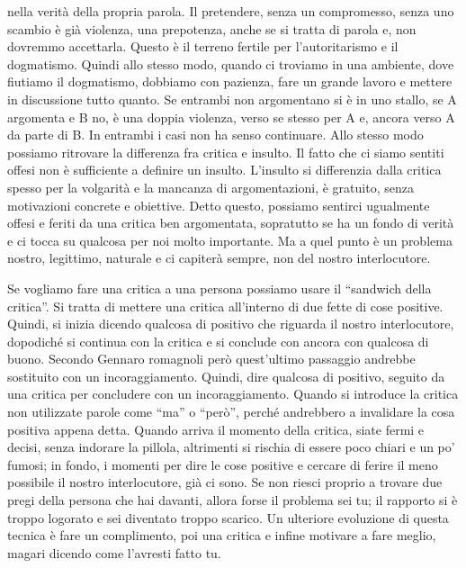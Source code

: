 \documentclass[12pt]{book} %
\begin{document}
nella verità della propria parola. Il pretendere, senza un compromesso, senza uno scambio è già violenza, una
prepotenza, anche se si tratta di parola e, non dovremmo accettarla. Questo è il terreno fertile per
l'autoritarismo e il dogmatismo. Quindi allo stesso modo, quando ci troviamo in una ambiente, dove
fiutiamo il dogmatismo, dobbiamo con pazienza, fare un grande lavoro e mettere in discussione tutto quanto. Se entrambi
non argomentano si è in uno stallo, se A argomenta e B no, è una doppia violenza, verso se stesso per A e, ancora verso
A da parte di B. In entrambi i casi non ha senso continuare. Allo stesso modo possiamo ritrovare la differenza fra
critica e insulto. Il fatto che ci siamo sentiti offesi non è sufficiente a definire un insulto.
L'insulto si differenzia dalla critica spesso per la volgarità e la mancanza di argomentazioni, è
gratuito, senza motivazioni concrete e obiettive. Detto questo, possiamo sentirci ugualmente offesi e feriti da una
critica ben argomentata, sopratutto se ha un fondo di verità e ci tocca su qualcosa per noi molto importante. Ma a quel
punto è un problema nostro, legittimo, naturale e ci capiterà sempre, non del nostro interlocutore. 


\bigskip

Se vogliamo fare una critica a una persona possiamo usare il “sandwich della critica”. Si tratta di mettere una critica
all'interno di due fette di cose positive. Quindi, si inizia dicendo qualcosa di positivo che
riguarda il nostro interlocutore, dopodiché si continua con la critica e si conclude con ancora con qualcosa di buono.
Secondo Gennaro romagnoli però quest'ultimo passaggio andrebbe sostituito con un  incoraggiamento. Quindi, dire qualcosa di positivo, seguito da una critica per concludere con un incoraggiamento.
Quando si introduce la critica non utilizzate parole come “ma” o “però”, perché andrebbero a invalidare la cosa
positiva appena detta. Quando arriva il momento della critica, siate fermi e decisi, senza indorare la pillola,
altrimenti si rischia di essere poco chiari e un po' fumosi; in fondo, i momenti per dire le cose
positive e cercare di ferire il meno possibile il nostro interlocutore, già ci sono. Se non riesci proprio a trovare
due pregi della persona che hai davanti, allora forse il problema sei tu; il rapporto si è troppo logorato e sei
diventato troppo scarico. Un ulteriore evoluzione di questa tecnica è fare un complimento, poi una critica e infine
motivare a fare meglio, magari dicendo come l'avresti fatto tu.


\bigskip
\end{document}
